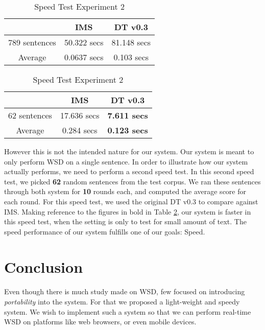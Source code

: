 \documentclass[a4paper,12pt]{nurop}
\begin{document}
\begin{table}
\begin{minipage}[h]{0.5\linewidth}
\footnotesize
\center
\begin{tabular}{| c | c | c |}
\hline
& IMS & DT v0.3 \\
\hline
789 sentences & 50.322 secs & 81.148 secs \\
\hline
Average & 0.0637 secs & 0.103 secs \\
\hline
\end{tabular}
\caption{Speed Test Experiment 1}
\label{tab:speedTest}
\end{minipage}
\begin{minipage}[h]{0.5\linewidth}
\footnotesize
\center
\begin{tabular}{| c | c | c |}
\hline
& IMS & DT v0.3 \\
\hline
62 sentences & 17.636 secs & \textbf{7.611 secs} \\
\hline
Average & 0.284 secs & \textbf{0.123 secs} \\
\hline
\end{tabular}
\caption{Speed Test Experiment 2}
\label{tab:speedTest2}
\end{minipage}
\end{table}

However this is not the intended nature for our system. Our system is meant to only perform WSD on a single sentence. In order to illustrate how our system actually performs, we need to perform a second speed test. In this second speed test, we picked \textbf{62} random sentences from the test corpus. We ran these sentences through both system for \textbf{10} rounds each, and computed the average score for each round. For this speed test, we used the original DT v0.3 to compare against IMS. Making reference to the figures in bold in Table \ref{tab:speedTest2}, our system is faster in this speed test, when the setting is only to test for small amount of text. The speed performance of our system fulfills one of our goals: Speed.

\section{Conclusion}
\paragraph{}
Even though there is much study made on WSD, few focused on introducing \textit{portability} into the system. For that we proposed a light-weight and speedy system. We wish to implement such a system so that we can perform real-time WSD on platforms like web browsers, or even mobile devices.
\end{document}

